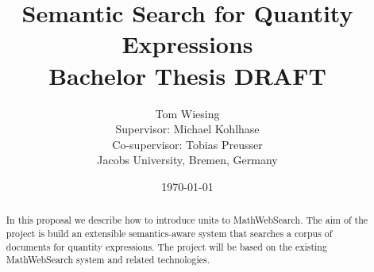 \documentclass[11pt]{article}
\title{Semantic Search for Quantity Expressions\\ \vspace{2 mm} Bachelor Thesis DRAFT\ednote{Remove draft status}}
\author{Tom Wiesing\\Supervisor: Michael Kohlhase\\Co-supervisor: Tobias Preusser\\Jacobs University, Bremen, Germany}
\date{\today}
\begin{document}
\maketitle

\begin{abstract}
  In this proposal we describe how to introduce units to MathWebSearch. The aim of the project is build an extensible semantics-aware system that searches a corpus of documents for quantity expressions. The project will be based on the existing MathWebSearch system and related technologies. 
\end{abstract}

\newpage

\tableofcontents

\newpage



\newpage



\newpage



\newpage



\newpage



\newpage



\newpage



\newpage

{}
\end{document}
